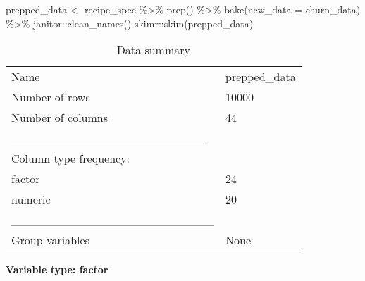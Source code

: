 \documentclass[
]{article}
\newenvironment{Shaded}{\begin{snugshade}}{\end{snugshade}}
\newcommand{\AttributeTok}[1]{\textcolor[rgb]{0.77,0.63,0.00}{#1}}
\newcommand{\FunctionTok}[1]{\textcolor[rgb]{0.00,0.00,0.00}{#1}}
\newcommand{\NormalTok}[1]{#1}
\newcommand{\OtherTok}[1]{\textcolor[rgb]{0.56,0.35,0.01}{#1}}
\newcommand{\SpecialCharTok}[1]{\textcolor[rgb]{0.00,0.00,0.00}{#1}}
\begin{document}
\begin{Shaded}
\begin{Highlighting}[]
\NormalTok{prepped\_data }\OtherTok{\textless{}{-}}\NormalTok{ recipe\_spec }\SpecialCharTok{\%\textgreater{}\%} \FunctionTok{prep}\NormalTok{() }\SpecialCharTok{\%\textgreater{}\%} \FunctionTok{bake}\NormalTok{(}\AttributeTok{new\_data =}\NormalTok{ churn\_data) }\SpecialCharTok{\%\textgreater{}\%}\NormalTok{ janitor}\SpecialCharTok{::}\FunctionTok{clean\_names}\NormalTok{()}
\NormalTok{skimr}\SpecialCharTok{::}\FunctionTok{skim}\NormalTok{(prepped\_data)}
\end{Highlighting}
\end{Shaded}

\begin{longtable}[]{@{}ll@{}}
\caption{Data summary}\tabularnewline
\toprule()
\endhead
Name & prepped\_data \\
Number of rows & 10000 \\
Number of columns & 44 \\
\_\_\_\_\_\_\_\_\_\_\_\_\_\_\_\_\_\_\_\_\_\_\_ & \\
Column type frequency: & \\
factor & 24 \\
numeric & 20 \\
\_\_\_\_\_\_\_\_\_\_\_\_\_\_\_\_\_\_\_\_\_\_\_\_ & \\
Group variables & None \\
\bottomrule()
\end{longtable}

\textbf{Variable type: factor}
\end{document}
